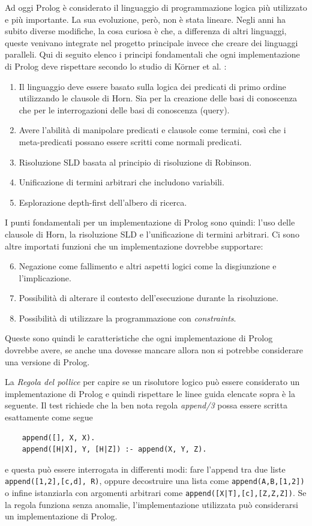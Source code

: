Ad oggi Prolog è considerato il linguaggio di programmazione logica più utilizzato e più importante. La sua evoluzione, però, non è stata lineare.
Negli anni ha subito diverse modifiche, la cosa curiosa è che, a differenza di altri linguaggi, queste venivano integrate nel progetto principale invece che creare dei linguaggi paralleli.
Qui di seguito elenco i principi fondamentali che ogni implementazione di Prolog deve rispettare secondo lo studio di K\"orner et al. \cite{korner2022fifty}:
\begin{enumerate}
    \item Il linguaggio deve essere basato sulla logica dei predicati di primo ordine utilizzando le clausole di Horn. Sia per la creazione delle basi di conoscenza che per le interrogazioni delle basi di conoscenza (query).
    \item Avere l'abilità di manipolare predicati e clausole come termini, così che i meta-predicati possano essere scritti come normali predicati.
    \item Risoluzione SLD \cite{kowalski1974predicate} basata al principio di risoluzione di Robinson.
    \item Unificazione di termini arbitrari che includono variabili.
    \item Esplorazione depth-first dell'albero di ricerca.
\end{enumerate}
I punti fondamentali per un implementazione di Prolog sono quindi: l'uso delle clausole
di Horn, la risoluzione SLD e l'unificazione di termini arbitrari. Ci sono altre importati funzioni che un implementazione dovrebbe supportare:
\begin{enumerate}
    \setcounter{enumi}{5}
    \item Negazione come fallimento e altri aspetti logici come la disgiunzione e l'implicazione.
    \item Possibilità di alterare il contesto dell'esecuzione durante la risoluzione.
    \item Possibilità di utilizzare la programmazione con \textit{constraints}.
\end{enumerate} 
Queste sono quindi le caratteristiche che ogni implementazione di Prolog dovrebbe avere, se anche una dovesse mancare allora non si potrebbe considerare una versione di Prolog. 

La \textit{Regola del pollice} per capire se un risolutore logico può essere considerato un implementazione di Prolog e quindi rispettare le linee guida elencate sopra è la seguente.
Il test richiede che la ben nota regola \textit{append/3} possa essere scritta esattamente come segue
\begin{lstlisting}
    append([], X, X).
    append([H|X], Y, [H|Z]) :- append(X, Y, Z).
\end{lstlisting}
e questa può essere interrogata in differenti modi: fare l'append tra due liste \verb+append([1,2],[c,d], R)+, oppure decostruire una lista come \verb+append(A,B,[1,2])+ o infine istanziarla con argomenti arbitrari come \verb+append([X|T],[c],[Z,Z,Z])+.
Se la regola funziona senza anomalie, l'implementazione utilizzata può considerarsi un implementazione di Prolog.

